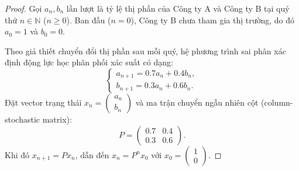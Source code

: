 \documentclass{article}
\begin{document}
\begin{proof}
	Gọi $a_n, b_n$ lần lượt là tỷ lệ thị phần của Công ty A và Công ty B tại quý thứ $n \in \mathbb{N}$ ($n \ge 0$). Ban đầu ($n = 0$), Công ty B chưa tham gia thị trường, do đó $a_0 = 1$ và $b_0 = 0$. 
	
	Theo giả thiết chuyển đổi thị phần sau mỗi quý, hệ phương trình sai phân xác định động lực học phân phối xác suất có dạng:
	\begin{equation*}
		\begin{cases}
			a_{n+1} = 0.7a_n + 0.4b_n, \\
			b_{n+1} = 0.3a_n + 0.6b_n.
		\end{cases}
	\end{equation*}
	Đặt vector trạng thái $x_n = \begin{pmatrix} a_n \\ b_n \end{pmatrix}$ và ma trận chuyển ngẫu nhiên cột (column-stochastic matrix):
	\begin{equation*}
		P = \begin{pmatrix} 0.7 & 0.4 \\ 0.3 & 0.6 \end{pmatrix}.
	\end{equation*}
	Khi đó $x_{n+1} = P x_n$, dẫn đến $x_n = P^n x_0$ với $x_0 = \begin{pmatrix} 1 \\ 0 \end{pmatrix}$.
	

\end{proof}
\end{document}
